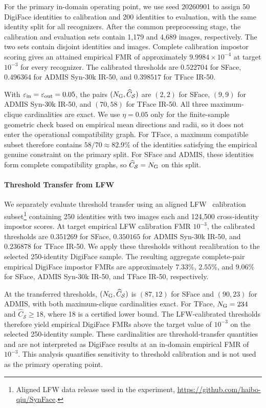 \documentclass[journal]{IEEEtran}
\begin{document}
\begin{bibunit}
For the primary in-domain operating point, we use seed 20260901 to assign 50 DigiFace identities to calibration and 200 identities to evaluation, with the same identity split for all recognizers. After the common preprocessing stage, the calibration and evaluation sets contain 1,179 and 4,689 images, respectively. The two sets contain disjoint identities and images. Complete calibration impostor scoring gives an attained
empirical FMR of approximately $9.9984\times10^{-4}$ at target $10^{-3}$ for every recognizer. The calibrated thresholds are $0.522704$ for SFace, $0.496364$ for ADMIS Syn-30k IR-50, and $0.398517$ for TFace IR-50.

With  $\varepsilon_{\rm in}=\varepsilon_{\rm out}=0.05$, the pairs $(N_{\rm G},\widehat C_{\mathcal S})$ are $(2,2)$ for SFace, $(9,9)$ for ADMIS Syn-30k IR-50, and $(70,58)$ for TFace IR-50. All three maximum-clique cardinalities are exact. We use $\eta=0.05$ only for the finite-sample geometric check based on empirical mean directions and radii, so it does not enter the operational compatibility graph. For TFace, a maximum compatible subset therefore contains $58/70\approx82.9\%$ of the identities satisfying the empirical genuine constraint on the primary split. For SFace and ADMIS, these identities form complete compatibility graphs, so $\widehat C_{\mathcal S}=N_{\rm G}$ on this split.


\paragraph{Threshold Transfer from LFW}

We separately evaluate threshold transfer using an aligned LFW~\cite{huang2008labeled} calibration subset\footnote{Aligned LFW data release used in the experiment, \url{https://github.com/haibo-qiu/SynFace}.} containing 250 identities with two images each and 124,500 cross-identity impostor scores. At target empirical LFW calibration FMR $10^{-3}$, the calibrated thresholds are $0.351269$ for SFace, $0.350165$ for ADMIS Syn-30k IR-50, and $0.236878$ for TFace IR-50. We apply these thresholds without recalibration to the selected 250-identity DigiFace sample. The resulting aggregate complete-pair empirical DigiFace impostor FMRs are approximately $7.33\%$, $2.55\%$, and $9.06\%$ for SFace, ADMIS Syn-30k IR-50, and TFace IR-50, respectively.


At the transferred thresholds, $(N_{\rm G},\widehat C_{\mathcal S})$ is $(87,12)$ for SFace and $(90,23)$ for ADMIS, with both maximum-clique cardinalities exact. For TFace, $N_{\rm G}=234$ and $\widehat C_{\mathcal S}\ge18$, where 18 is a certified lower bound. The LFW-calibrated thresholds therefore yield empirical DigiFace FMRs above the target value of $10^{-3}$ on the selected 250-identity sample. These cardinalities are threshold-transfer quantities and are not interpreted as DigiFace results at an in-domain empirical FMR of $10^{-3}$. This analysis quantifies sensitivity to threshold calibration and is not used as the primary operating point.


\end{bibunit}
\end{document}
